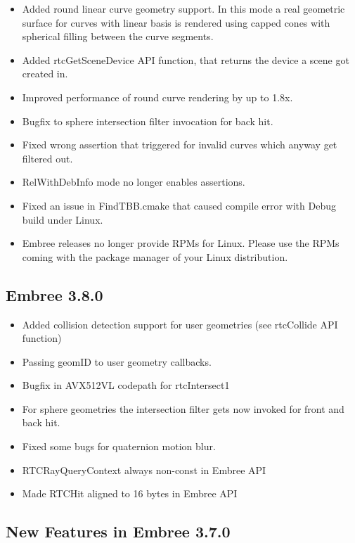 \begin{itemize}
\tightlist
\item
  Added round linear curve geometry support. In this mode a real
  geometric surface for curves with linear basis is rendered using
  capped cones with spherical filling between the curve segments.
\item
  Added rtcGetSceneDevice API function, that returns the device a scene
  got created in.
\item
  Improved performance of round curve rendering by up to 1.8x.
\item
  Bugfix to sphere intersection filter invocation for back hit.
\item
  Fixed wrong assertion that triggered for invalid curves which anyway
  get filtered out.
\item
  RelWithDebInfo mode no longer enables assertions.
\item
  Fixed an issue in FindTBB.cmake that caused compile error with Debug
  build under Linux.
\item
  Embree releases no longer provide RPMs for Linux. Please use the RPMs
  coming with the package manager of your Linux distribution.
\end{itemize}

\subsection{Embree 3.8.0}\label{embree-3.8.0}

\begin{itemize}
\tightlist
\item
  Added collision detection support for user geometries (see rtcCollide
  API function)
\item
  Passing geomID to user geometry callbacks.
\item
  Bugfix in AVX512VL codepath for rtcIntersect1
\item
  For sphere geometries the intersection filter gets now invoked for
  front and back hit.
\item
  Fixed some bugs for quaternion motion blur.
\item
  RTCRayQueryContext always non-const in Embree API
\item
  Made RTCHit aligned to 16 bytes in Embree API
\end{itemize}

\subsection{New Features in Embree
3.7.0}\label{new-features-in-embree-3.7.0}

